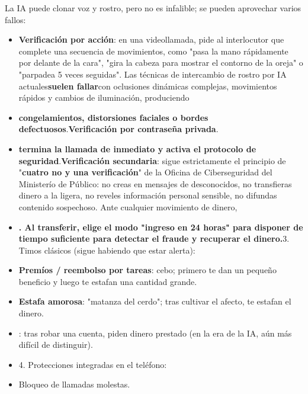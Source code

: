
La IA puede clonar voz y rostro, pero no es infalible; se pueden aprovechar varios fallos:

\begin{itemize}
  \item \textbf{Verificación por acción}: en una videollamada, pide al interlocutor que complete una secuencia de movimientos, como "pasa la mano rápidamente por delante de la cara", "gira la cabeza para mostrar el contorno de la oreja" o "parpadea 5 veces seguidas". Las técnicas de intercambio de rostro por IA actuales\textbf{suelen fallar}con oclusiones dinámicas complejas, movimientos rápidos y cambios de iluminación, produciendo
  \item \textbf{congelamientos, distorsiones faciales o bordes defectuosos}.\textbf{Verificación por contraseña privada}.
  \item \textbf{termina la llamada de inmediato y activa el protocolo de seguridad}.\textbf{Verificación secundaria}: sigue estrictamente el principio de "\textbf{cuatro no y una verificación}" de la Oficina de Ciberseguridad del Ministerío de Público: no creas en mensajes de desconocidos, no transfieras dinero a la ligera, no reveles información personal sensible, no difundas contenido sospechoso. Ante cualquier movimiento de dinero,
\end{itemize}


\begin{itemize}
  \item \textbf{. Al transferir, elige el modo "ingreso en 24 horas" para disponer de tiempo suficiente para detectar el fraude y recuperar el dinero.}3. Timos clásicos (sigue habiendo que estar alerta):
  \item \textbf{Premíos / reembolso por tareas}: cebo; primero te dan un pequeño beneficio y luego te estafan una cantidad grande.
  \item \textbf{Estafa amorosa}: "matanza del cerdo"; tras cultivar el afecto, te estafan el dinero.
\end{itemize}


\begin{itemize}
  \item : tras robar una cuenta, piden dinero prestado (en la era de la IA, aún más difícil de distinguir).
  \item 4. Protecciones integradas en el teléfono:
  \item Bloqueo de llamadas molestas.
\end{itemize}

